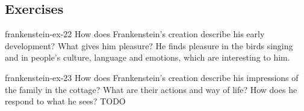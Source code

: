\documentclass[preview]{standalone}
\begin{document}
\genpage

\subsection{Exercises}


\begin{snippetexercise}{frankenstein-ex-22}
    {How does Frankenstein's creation describe his early development? What gives him pleasure?}
    He finds pleasure in the birds singing and in people's culture, language
    and emotions, which are interesting to him.
\end{snippetexercise}

\begin{snippetexercise}{frankenstein-ex-23}
    {How does Frankenstein's creation describe his impressions of the family in the cottage? What are
    their actions and way of life? How does he respond to what he sees?}
    TODO 
\end{snippetexercise}
\end{document}
